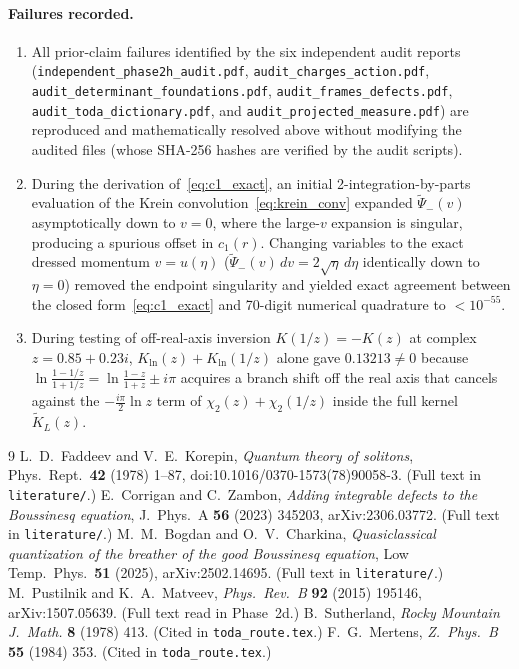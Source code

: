 \documentclass[11pt,a4paper]{article}
\theoremstyle{remark}
\begin{document}
\paragraph{Failures recorded.}
\begin{enumerate}
\item All prior-claim failures identified by the six independent audit reports
  (\texttt{independent\_\allowbreak phase2h\_\allowbreak audit.pdf},
  \texttt{audit\_\allowbreak charges\_\allowbreak action.pdf},
  \texttt{audit\_\allowbreak determinant\_\allowbreak foundations.pdf},
  \texttt{audit\_\allowbreak frames\_\allowbreak defects.pdf},
  \texttt{audit\_\allowbreak toda\_\allowbreak dictionary.pdf}, and
  \texttt{audit\_\allowbreak projected\_\allowbreak measure.pdf}) are
  reproduced and mathematically resolved above without modifying the audited files (whose
  SHA-256 hashes are verified by the audit scripts).
\item During the derivation of~\eqref{eq:c1_exact}, an initial 2-integration-by-parts evaluation
  of the Krein convolution~\eqref{eq:krein_conv} expanded $\widetilde{\Psi}_-(v)$ asymptotically
  down to $v = 0$, where the large-$v$ expansion is singular, producing a spurious offset in
  $c_1(r)$. Changing variables to the exact dressed momentum $v = u(\eta)$ ($\widetilde{\Psi}_-(v)\,dv = 2\sqrt{\eta}\,d\eta$
  identically down to $\eta = 0$) removed the endpoint singularity and yielded exact agreement
  between the closed form~\eqref{eq:c1_exact} and 70-digit numerical quadrature to $<10^{-55}$.
\item During testing of off-real-axis inversion $K(1/z) = -K(z)$ at complex $z = 0.85 + 0.23i$,
  $K_{\ln}(z) + K_{\ln}(1/z)$ alone gave $0.13213\ne 0$ because $\ln\frac{1-1/z}{1+1/z} = \ln\frac{1-z}{1+z} \pm i\pi$
  acquires a branch shift off the real axis that cancels against the $-\frac{i\pi}{2}\ln z$ term
  of $\chi_2(z) + \chi_2(1/z)$ inside the full kernel $\widetilde{K}_L(z)$.
\end{enumerate}

\begin{thebibliography}{9}\small
{} L.~D.~Faddeev and V.~E.~Korepin, \emph{Quantum theory of solitons}, Phys.\ Rept.\ \textbf{42} (1978) 1--87, doi:10.1016/0370-1573(78)90058-3. (Full text in \texttt{literature/}.)
 E.~Corrigan and C.~Zambon, \emph{Adding integrable defects to the Boussinesq equation}, J.\ Phys.\ A \textbf{56} (2023) 345203, arXiv:2306.03772. (Full text in \texttt{literature/}.)
 M.~M.~Bogdan and O.~V.~Charkina, \emph{Quasiclassical quantization of the breather of the good Boussinesq equation}, Low Temp.\ Phys.\ \textbf{51} (2025), arXiv:2502.14695. (Full text in \texttt{literature/}.)
 M.~Pustilnik and K.~A.~Matveev, \emph{Phys.\ Rev.\ B} \textbf{92} (2015) 195146, arXiv:1507.05639. (Full text read in Phase~2d.)
 B.~Sutherland, \emph{Rocky Mountain J.\ Math.} \textbf{8} (1978) 413. (Cited in \texttt{toda\_route.tex}.)
 F.~G.~Mertens, \emph{Z.\ Phys.\ B} \textbf{55} (1984) 353. (Cited in \texttt{toda\_route.tex}.)
\end{thebibliography}
\end{document}
